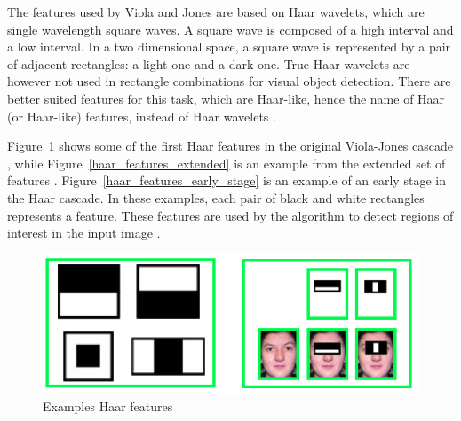 \vspace{\baselineskip}
\noindent The features used by Viola and Jones are based on Haar wavelets, which are single wavelength square waves. A square wave is composed of a high interval and a low interval. In a two dimensional space, a square wave is represented by a pair of adjacent rectangles: a light one and a dark one. True Haar wavelets are however not used in rectangle combinations for visual object detection. There are better suited features for this task, which are Haar-like, hence the name of Haar (or Haar-like) features, instead of Haar wavelets \cite{HEW07}.
\newline

\noindent Figure~\ref{haar_features_first_2_stage} shows some of the first Haar features in the original Viola-Jones cascade \cite{HEW07}, while Figure~\ref{haar_features_extended} is an example from the extended set of features \cite{DIN08}. Figure~\ref{haar_features_early_stage} is an example of an early stage in the Haar cascade. In these examples, each pair of black and white rectangles represents a feature. These features are used by the algorithm to detect regions of interest in the input image \cite{HAR12}.
\newline

\begin{figure}[!h]
\begin{center}
\noindent \includegraphics[scale=0.8]{figures/haar_features_first_2_stage} 
\newline
\caption{Examples Haar features}
\label{haar_features_first_2_stage}
\end{center} 
\end{figure}

